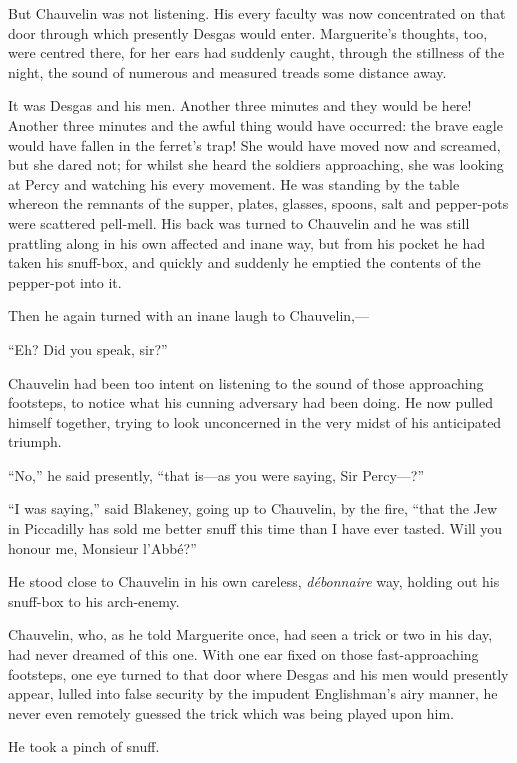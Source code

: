 \documentclass[paper=a5,BCOR=7mm,twoside,DIV=calc,12pt,usegeometry,chapterprefix,endperiod,headings=big]{scrbook}
\begin{document}
But Chauvelin was not listening. His every faculty was now concentrated on that door through which presently Desgas would enter. Marguerite's thoughts, too, were centred there, for her ears had suddenly caught, through the stillness of the night, the sound of numerous and measured treads some distance away.

It was Desgas and his men. Another three minutes and they would be here! Another three minutes and the awful thing would have occurred: the brave eagle would have fallen in the ferret's trap! She would have moved now and screamed, but she dared not; for whilst she heard the soldiers approaching, she was looking at Percy and watching his every movement. He was standing by the table whereon the remnants of the supper, plates, glasses, spoons, salt and pepper-pots were scattered pell-mell. His back was turned to Chauvelin and he was still prattling along in his own affected and inane way, but from his pocket he had taken his snuff-box, and quickly and suddenly he emptied the contents of the pepper-pot into it.

Then he again turned with an inane laugh to Chauvelin,---

\enquote{Eh? Did you speak, sir?}

Chauvelin had been too intent on listening to the sound of those approaching footsteps, to notice what his cunning adversary had been doing. He now pulled himself together, trying to look unconcerned in the very midst of his anticipated triumph.

\enquote{No,} he said presently, \enquote{that is---as you were saying, Sir Percy---?}

\enquote{I was saying,} said Blakeney, going up to Chauvelin, by the fire, \enquote{that the Jew in Piccadilly has sold me better snuff this time than I have ever tasted. Will you honour me, Monsieur l'Abbé?}

He stood close to Chauvelin in his own careless, \textit{débonnaire} way, holding out his snuff-box to his arch-enemy.

Chauvelin, who, as he told Marguerite once, had seen a trick or two in his day, had never dreamed of this one. With one ear fixed on those fast-approaching footsteps, one eye turned to that door where Desgas and his men would presently appear, lulled into false security by the impudent Englishman's airy manner, he never even remotely guessed the trick which was being played upon him.

He took a pinch of snuff.
\end{document}
